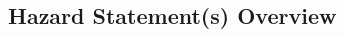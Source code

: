 \documentclass[{{ data.paper }}, 11pt]{article}
\newcommand{\done}{\rlap{\color{MerckTeal}$\square$}{\raisebox{2pt}{\large\hspace{1pt}\ding{51} } }\hspace{-2.5pt} }
\begin{document}
\subsection*{Hazard Statement(s) Overview}
\begin{multicols}{3}
\begin{checklist}
\item{%
\item{%
\item{%
\item{%
\item{%
\item{%
\item{%
\item{%
\item{%
\item{%
\item{%
\item{%
\item{%
\item{%
\item{%
\item{%
}}}}}}}}}}}}}}}}
\end{checklist}
\end{multicols}
\end{document}
